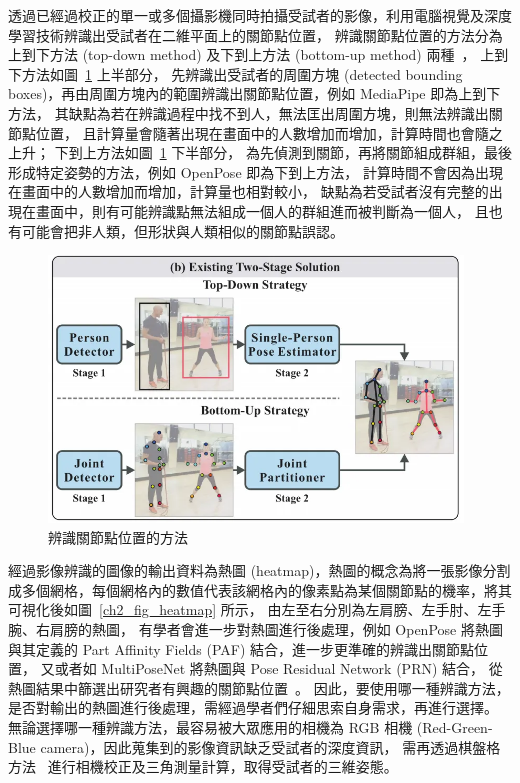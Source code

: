 透過已經過校正的單一或多個攝影機同時拍攝受試者的影像，利用電腦視覺及深度學習技術辨識出受試者在二維平面上的關節點位置，
辨識關節點位置的方法分為上到下方法 (top-down method) 及下到上方法 (bottom-up method) 兩種~\cite{nie2019single}，
上到下方法如圖~\ref{ch2_fig_topvsbottom} 上半部分，
先辨識出受試者的周圍方塊 (detected bounding boxes)，再由周圍方塊內的範圍辨識出關節點位置，例如 MediaPipe 即為上到下方法，
其缺點為若在辨識過程中找不到人，無法匡出周圍方塊，則無法辨識出關節點位置，
且計算量會隨著出現在畫面中的人數增加而增加，計算時間也會隨之上升；
下到上方法如圖~\ref{ch2_fig_topvsbottom} 下半部分，
為先偵測到關節，再將關節組成群組，最後形成特定姿勢的方法，例如 OpenPose 即為下到上方法，
計算時間不會因為出現在畫面中的人數增加而增加，計算量也相對較小，
缺點為若受試者沒有完整的出現在畫面中，則有可能辨識點無法組成一個人的群組進而被判斷為一個人，
且也有可能會把非人類，但形狀與人類相似的關節點誤認。

\begin{figure}[!ht]
    \centering
    \includegraphics[width=11cm]{figure/ch2_fig_topvsbottom.png}
     \caption[辨識關節點位置的方法 ~\cite{nie2019single}]{辨識關節點位置的方法 ~\cite{nie2019single}}
     \label{ch2_fig_topvsbottom}
\end{figure}

經過影像辨識的圖像的輸出資料為熱圖 (heatmap)，熱圖的概念為將一張影像分割成多個網格，每個網格內的數值代表該網格內的像素點為某個關節點的機率，將其可視化後如圖~\ref{ch2_fig_heatmap} 所示，
由左至右分別為左肩膀、左手肘、左手腕、右肩膀的熱圖，
有學者會進一步對熱圖進行後處理，例如 OpenPose 將熱圖與其定義的 Part Affinity Fields (PAF) 結合，進一步更準確的辨識出關節點位置，
又或者如 MultiPoseNet 將熱圖與 Pose Residual Network (PRN) 結合，
從熱圖結果中篩選出研究者有興趣的關節點位置~\cite{kocabas2018multiposenet}。
因此，要使用哪一種辨識方法，是否對輸出的熱圖進行後處理，需經過學者們仔細思索自身需求，再進行選擇。
無論選擇哪一種辨識方法，最容易被大眾應用的相機為 RGB 相機 (Red-Green-Blue camera)，因此蒐集到的影像資訊缺乏受試者的深度資訊，
需再透過棋盤格方法~\cite{zhang1999flexible} 進行相機校正及三角測量計算，取得受試者的三維姿態。

